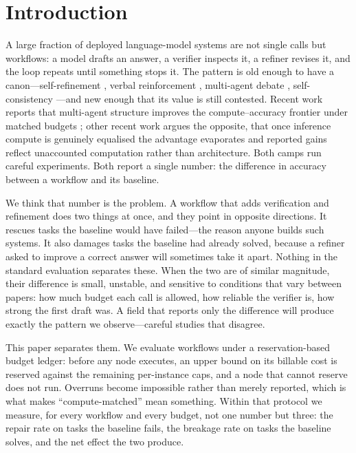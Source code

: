 \documentclass{article}
\begin{document}
\section{Introduction}

A large fraction of deployed language-model systems are not single calls but
workflows: a model drafts an answer, a verifier inspects it, a refiner revises
it, and the loop repeats until something stops it. The pattern is old enough to
have a canon---self-refinement \citep{madaan2023selfrefine}, verbal
reinforcement \citep{shinn2023reflexion}, multi-agent debate
\citep{du2024debate}, self-consistency \citep{wang2023selfconsistency}---and
new enough that its value is still contested. Recent work reports that
multi-agent structure improves the compute--accuracy frontier under matched
budgets \citep{multiagent2026pareto}; other recent work argues the opposite,
that once inference compute is genuinely equalised the advantage evaporates and
reported gains reflect unaccounted computation rather than architecture. Both
camps run careful experiments. Both report a single number: the difference in
accuracy between a workflow and its baseline.

We think that number is the problem. A workflow that adds verification and
refinement does two things at once, and they point in opposite directions. It
rescues tasks the baseline would have failed---the reason anyone builds such
systems. It also damages tasks the baseline had already solved, because a
refiner asked to improve a correct answer will sometimes take it apart. Nothing
in the standard evaluation separates these. When the two are of similar
magnitude, their difference is small, unstable, and sensitive to conditions that
vary between papers: how much budget each call is allowed, how reliable the
verifier is, how strong the first draft was. A field that reports only the
difference will produce exactly the pattern we observe---careful studies that
disagree.

This paper separates them. We evaluate workflows under a reservation-based
budget ledger: before any node executes, an upper bound on its billable cost is
reserved against the remaining per-instance caps, and a node that cannot reserve
does not run. Overruns become impossible rather than merely reported, which is
what makes ``compute-matched'' mean something. Within that protocol we measure,
for every workflow and every budget, not one number but three: the repair rate
on tasks the baseline fails, the breakage rate on tasks the baseline solves, and
the net effect the two produce.
\end{document}

